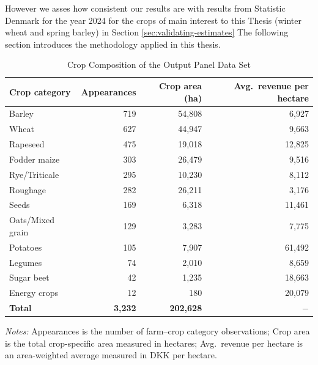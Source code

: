 \documentclass[12pt]{article}
\begin{document}
However we asses how consistent our results are with results from Statistic Denmark for the year 2024 for the crops of main interest to this Thesis (winter wheat and spring barley) in Section \ref{sec:validating-estimates}
The following section introduces the methodology applied in this thesis.

\begin{table}[htbp]
\centering
\small
\caption{Crop Composition of the Output Panel Data Set}
\label{tab:sample-composition}
\begin{threeparttable}
\begin{tabular}{lrrr}
\toprule
\textbf{Crop category} & \textbf{Appearances} & \textbf{Crop area (ha)} & \textbf{Avg.\ revenue per hectare} \\
\midrule
Barley              &   719 & 54{,}808 &  6{,}927 \\
Wheat               &   627 & 44{,}947 &  9{,}663 \\
Rapeseed            &   475 & 19{,}018 & 12{,}825 \\
Fodder maize        &   303 & 26{,}479 &  9{,}516 \\
Rye/Triticale       &   295 & 10{,}230 &  8{,}112 \\
Roughage            &   282 & 26{,}211 &  3{,}176 \\
Seeds               &   169 &  6{,}318 & 11{,}461 \\
Oats/Mixed grain    &   129 &  3{,}283 &  7{,}775 \\
Potatoes            &   105 &  7{,}907 & 61{,}492 \\
Legumes             &    74 &  2{,}010 &  8{,}659 \\
Sugar beet          &    42 &  1{,}235 & 18{,}663 \\
Energy crops        &    12 &    180   & 20{,}079 \\
\midrule
\textbf{Total}      & \textbf{3{,}232} & \textbf{202{,}628} & $-$ \\
\bottomrule
\end{tabular}
\begin{tablenotes}
\footnotesize
\item \textit{Notes:} Appearances is the number of farm--crop category observations; Crop area is the total crop-specific area measured in hectares; Avg.\ revenue per hectare is an area-weighted average measured in DKK per hectare.
\end{tablenotes}
\end{threeparttable}
\end{table}
\end{document}
